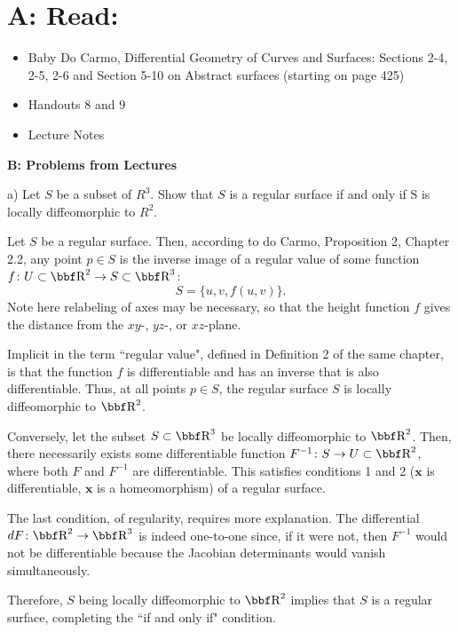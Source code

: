 \documentclass[10pt,letterpaper]{hmcpset}
\begin{document}
\section*{A: Read: } 

\begin{itemize}
\item{Baby Do Carmo, Differential Geometry
    of Curves and Surfaces:  
Sections 2-4, 2-5, 2-6 and Section 5-10 on Abstract surfaces (starting 
on page 425)} 
\item{Handouts 8 and 9}
\item{Lecture Notes}
\end{itemize}

\textbf{B: Problems from Lectures}


\begin{problem}
a) Let $S$ be a subset of $R^3$.  Show that $S$ is a
regular surface if and only if S is locally diffeomorphic 
to $R^2$.
\end{problem}
\begin{solution}
Let $S$ be a regular surface. Then, according to do Carmo, Proposition 2, Chapter 2.2, any point $p \in S$ is the inverse image of a regular value of some function $f \colon U \subset \RR^2 \to S \subset \RR^3$:
\[
S = \{u, v, f(u,v) \}.
\]
Note here relabeling of axes may be necessary, so that the height function $f$ gives the distance from the $xy$-, $yz$-, or $xz$-plane.

Implicit in the term ``regular value", defined in Definition 2 of the same chapter, is that the function $f$ is differentiable and has an inverse that is also differentiable. Thus, at all points $p \in S$, the regular surface $S$ is locally diffeomorphic to $\RR^2$.

Conversely, let the subset $S \subset \RR^3$ be locally diffeomorphic to $\RR^2$. Then, there necessarily exists some differentiable function $F^{-1} \colon S \to U \subset \RR^2$, where both $F$ and $F^{-1}$ are differentiable. This satisfies conditions 1 and 2 ($\mathbf{x}$ is differentiable, $\mathbf{x}$ is a homeomorphism)  of a regular surface. 

The last condition, of regularity, requires more explanation. The differential $dF \colon \RR^2 \to \RR^3$ is indeed one-to-one since, if it were not, then $F^{-1}$ would not be differentiable because the Jacobian determinants would vanish simultaneously. 

Therefore, $S$ being locally diffeomorphic to $\RR^2$ implies that $S$ is a regular surface, completing the ``if and only if" condition.

\end{solution}
\end{document}
